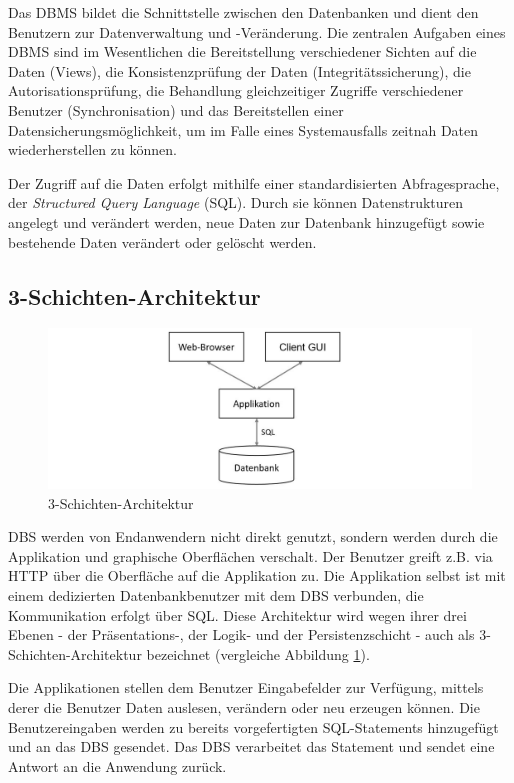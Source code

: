 Das DBMS bildet die Schnittstelle zwischen den Datenbanken und dient den Benutzern zur Datenverwaltung und -Veränderung. Die zentralen Aufgaben eines DBMS sind im Wesentlichen die Bereitstellung verschiedener Sichten auf die Daten (Views), die Konsistenzprüfung der Daten (Integritätssicherung), die Autorisationsprüfung, die Behandlung gleichzeitiger Zugriffe verschiedener Benutzer (Synchronisation) und das Bereitstellen einer Datensicherungsmöglichkeit, um im Falle eines Systemausfalls zeitnah Daten wiederherstellen zu können.

Der Zugriff auf die Daten erfolgt mithilfe einer standardisierten Abfragesprache, der \emph{Structured Query Language} (SQL). Durch sie können Datenstrukturen angelegt und verändert werden, neue Daten zur Datenbank hinzugefügt sowie bestehende Daten verändert oder gelöscht werden. 

\subsection{3-Schichten-Architektur}
\begin{figure}[H]
	\centering
	\includegraphics[width=\textwidth]{images/SQL_Injection/3TierArchitecture.jpg}
	\caption{3-Schichten-Architektur}
	\label{fig:3TierArchitecture}
\end{figure}

DBS werden von Endanwendern nicht direkt genutzt, sondern werden durch die Applikation und graphische Oberflächen verschalt. Der Benutzer greift z.B. via HTTP über die Oberfläche auf die Applikation zu. Die Applikation selbst ist mit einem dedizierten Datenbankbenutzer mit dem DBS verbunden, die Kommunikation erfolgt über SQL. Diese Architektur wird wegen ihrer drei Ebenen - der Präsentations-, der Logik- und der Persistenzschicht - auch als 3-Schichten-Architektur bezeichnet (vergleiche Abbildung \ref{fig:3TierArchitecture}). 

Die Applikationen stellen dem Benutzer Eingabefelder zur Verfügung, mittels derer die Benutzer Daten auslesen, verändern oder neu erzeugen können. Die Benutzereingaben werden zu bereits vorgefertigten SQL-Statements hinzugefügt und an das DBS gesendet. Das DBS verarbeitet das Statement und sendet eine Antwort an die Anwendung zurück.

